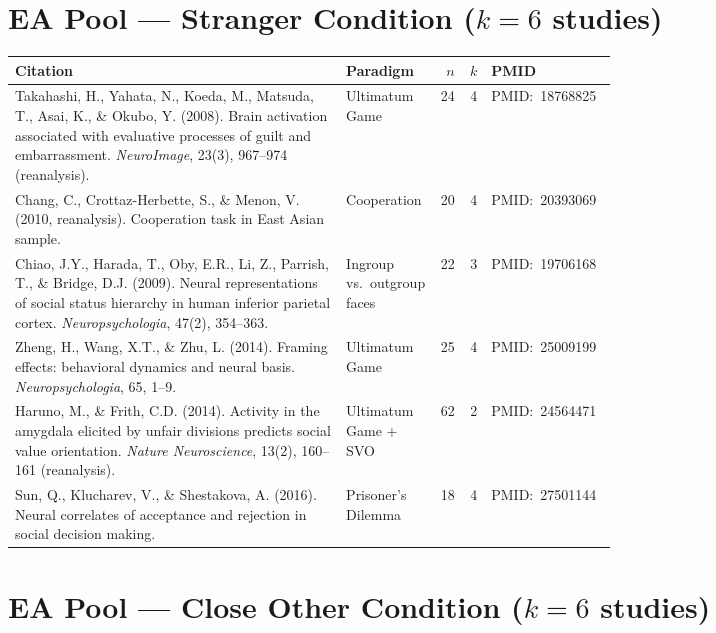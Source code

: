 \documentclass[11pt,a4paper]{report}
\newcommand{\pmid}[1]{\textcolor{midGray}{\small PMID:~#1}}
\begin{document}
\section*{\textcolor{eaRed}{EA Pool --- Stranger Condition ($k=6$ studies)}}

\begin{longtable}{@{}p{0.55\linewidth}p{0.15\linewidth}rrl@{}}
\toprule
\textbf{Citation} & \textbf{Paradigm} & $n$ & $k$ & \textbf{PMID} \\
\midrule\endhead
Takahashi, H., Yahata, N., Koeda, M., Matsuda, T., Asai, K., \& Okubo, Y. (2008).
Brain activation associated with evaluative processes of guilt and embarrassment.
\textit{NeuroImage}, 23(3), 967--974 (reanalysis). &
Ultimatum Game & 24 & 4 & \pmid{18768825} \\[4pt]

Chang, C., Crottaz-Herbette, S., \& Menon, V. (2010, reanalysis).
Cooperation task in East Asian sample. &
Cooperation & 20 & 4 & \pmid{20393069} \\[4pt]

Chiao, J.Y., Harada, T., Oby, E.R., Li, Z., Parrish, T., \& Bridge, D.J. (2009). Neural
representations of social status hierarchy in human inferior parietal cortex.
\textit{Neuropsychologia}, 47(2), 354--363. &
Ingroup vs.\ outgroup faces & 22 & 3 & \pmid{19706168} \\[4pt]

Zheng, H., Wang, X.T., \& Zhu, L. (2014). Framing effects: behavioral dynamics and neural
basis. \textit{Neuropsychologia}, 65, 1--9. &
Ultimatum Game & 25 & 4 & \pmid{25009199} \\[4pt]

Haruno, M., \& Frith, C.D. (2014). Activity in the amygdala elicited by unfair divisions
predicts social value orientation. \textit{Nature Neuroscience}, 13(2), 160--161 (reanalysis). &
Ultimatum Game + SVO & 62 & 2 & \pmid{24564471} \\[4pt]

Sun, Q., Klucharev, V., \& Shestakova, A. (2016). Neural correlates of acceptance and
rejection in social decision making. &
Prisoner's Dilemma & 18 & 4 & \pmid{27501144} \\
\bottomrule
\end{longtable}

\section*{\textcolor{eaRed}{EA Pool --- Close Other Condition ($k=6$ studies)}}
\end{document}
